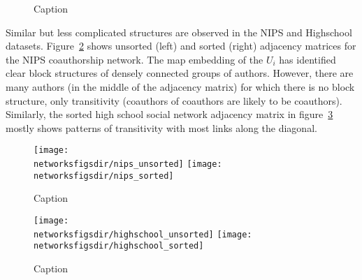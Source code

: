 \begin{figure}[ht]
  \centering
{}
  \caption{Caption}
  \label{fig:networks:butterfly}
\end{figure}

Similar but less complicated structures are observed in the NIPS and Highschool datasets.
Figure~\ref{fig:networks:nips} shows unsorted (left) and sorted (right) adjacency matrices for the NIPS coauthorship network.
The map embedding of the $U_i$ has identified clear block structures of densely connected groups of authors.
However, there are many authors (in the middle of the adjacency matrix) for which there is no block structure, only transitivity (coauthors of coauthors are likely to be coauthors).
Similarly, the sorted high school social network adjacency matrix in figure~\ref{fig:networks:highschool} mostly shows patterns of transitivity with most links along the diagonal.

\begin{figure}[ht]
  \centering
  \texttt{[image: \\networksfigsdir/nips\_unsorted]}
  \texttt{[image: \\networksfigsdir/nips\_sorted]}
  \caption{Caption}
  \label{fig:networks:nips}
\end{figure}

\begin{figure}[ht]
  \centering
  \texttt{[image: \\networksfigsdir/highschool\_unsorted]}
  \texttt{[image: \\networksfigsdir/highschool\_sorted]}
  \caption{Caption}
  \label{fig:networks:highschool}
\end{figure}

